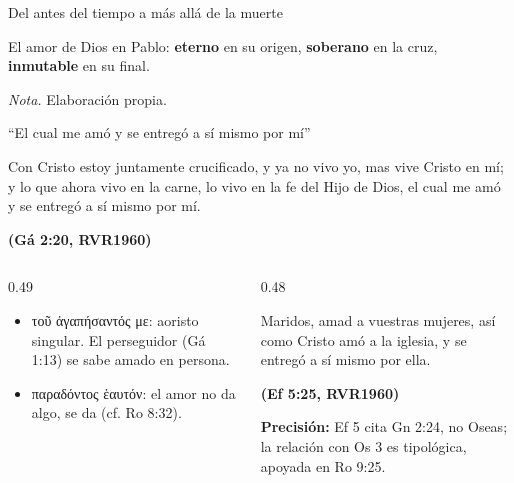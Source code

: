 \documentclass[hyperref={bookmarks=false},aspectratio=169]{beamer}
\newcommand{\grc}[1]{\foreignlanguage{ancientgreek}{#1}}
\newcommand{\fuente}[1]{\par\hfill{\upshape\bfseries\footnotesize\textcolor{azul}{#1}}}
\newcommand{\destacar}[1]{\textbf{\textcolor{azul}{#1}}}
\newcommand{\precision}[1]{{\footnotesize\color{gris}\textbf{Precisión:} #1}}
\begin{document}
\begin{frame}{Del antes del tiempo a más allá de la muerte}
\centering
{}\par\bigskip
\small El amor de Dios en Pablo: \destacar{eterno} en su origen, \destacar{soberano} en la cruz, \destacar{inmutable} en su final.\par
{\fontsize{5}{6}\selectfont\color{gris}\textit{Nota.} Elaboración propia.}
\end{frame}

\begin{frame}{``El cual me amó y se entregó a sí mismo por mí''}
\begin{cita}Con Cristo estoy juntamente crucificado, y ya no vivo yo, mas vive Cristo en mí; y lo que ahora vivo en la carne, lo vivo en la fe del Hijo de Dios, el cual me amó y se entregó a sí mismo por mí.\fuente{(Gá 2:20, RVR1960)}\end{cita}
\begin{columns}[t,onlytextwidth]
\begin{column}{0.49\textwidth}\scriptsize
\begin{itemize}
\item \grc{τοῦ ἀγαπήσαντός με}: aoristo singular. El perseguidor (Gá 1:13) se sabe amado en persona.
\item \grc{παραδόντος ἑαυτόν}: el amor no da algo, se da (cf. Ro 8:32).
\end{itemize}
\end{column}
\begin{column}{0.48\textwidth}
\begin{cita}Maridos, amad a vuestras mujeres, así como Cristo amó a la iglesia, y se entregó a sí mismo por ella.\fuente{(Ef 5:25, RVR1960)}\end{cita}
\precision{Ef 5 cita Gn 2:24, no Oseas; la relación con Os 3 es tipológica, apoyada en Ro 9:25.}
\end{column}
\end{columns}
\end{frame}
\end{document}
